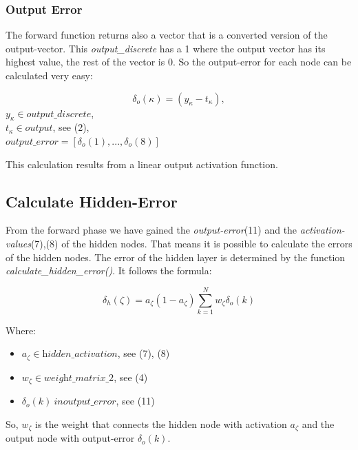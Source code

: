 \documentclass[10pt,a4paper]{article}
\begin{document}
  	\subsubsection{Output Error}
  	The forward function returns also a vector that is a converted version of the output-vector. This \textit{output\_discrete} has a 1 where the output vector has its highest value, the rest of the vector is 0. So the output-error for each node can be calculated very easy:
  	 \begin{center}
  		\begin{equation}
  		\delta_o(\kappa) = (y_{\kappa}-t_{\kappa}),
  		\end{equation}
  		$ y_{\kappa} \in \textit{output\_discrete} $, \\
  		$ t_{\kappa} \in \textit{output}$, see (2), \\
  		$ \textit{output\_error} = [\delta_o(1),...,\delta_o(8)] $
  	\end{center}
  	This calculation results from a linear output activation function.
  	\subsection{Calculate Hidden-Error}								%
	From the forward phase we have gained the \textit{output-error}(11) and the \textit{activation-values}(7),(8) of the hidden nodes. That means it is possible to calculate the errors of the hidden nodes. The error of the hidden layer is determined by the function \textit{calculate\_hidden\_error()}. It follows the formula: \\
	 \begin{center}
		\begin{equation}
		\delta_h(\zeta) = a_{\zeta}(1-a_{\zeta}) \sum_{k=1}^{N} w_{\zeta}\delta_o(k)
		\end{equation} 
	\end{center}
	Where:
	\begin{itemize}
		\item $ a_{\zeta} \in \textit{hidden\_activation} $, see (7), (8)
		\item $ w_{\zeta} \in \textit{weight\_matrix\_2}$, see (4)
		\item $ \delta_o(k) \ in \textit{output\_error} $, see (11)
	\end{itemize}
	So, $w_{\zeta}$ is the weight that connects the hidden node with activation $a_{\zeta}$ and the output node with output-error $\delta_o(k)$.
\end{document}
